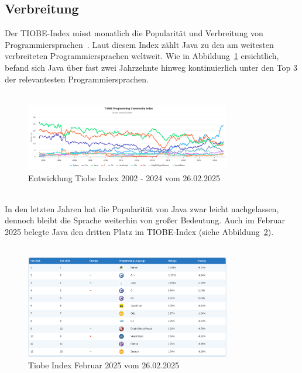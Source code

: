 \documentclass[11pt]{article}
\begin{document}
    \subsection{Verbreitung}
    Der TIOBE-Index misst monatlich die Popularität und Verbreitung von Programmiersprachen~\cite{tiobe}.
    Laut diesem Index zählt Java zu den am weitesten verbreiteten Programmiersprachen weltweit.
    Wie in Abbildung~\ref{fig:entwicklung-tiobe} ersichtlich, befand sich Java über fast zwei Jahrzehnte hinweg
    kontinuierlich unter den Top 3 der relevantesten Programmiersprachen.\\
    \\
    \begin{figure}[h]
        \centering
        \includegraphics[width=0.8\textwidth]{pictures/Screenshot 2025-02-26 at 19-53-49 TIOBE Index - TIOBE}
        \caption{Entwicklung Tiobe Index 2002 - 2024 vom 26.02.2025 }
        \label{fig:entwicklung-tiobe}
    \end{figure}
    \\
    In den letzten Jahren hat die Popularität von Java zwar leicht nachgelassen, dennoch bleibt die Sprache weiterhin
    von großer Bedeutung.
    Auch im Februar 2025 belegte Java den dritten Platz im TIOBE-Index (siehe Abbildung~\ref{fig:tiobe-java-2025}).\\
    \\
    \begin{figure}[h]
        \centering
        \includegraphics[width=0.8\textwidth]{pictures/Screenshot 2025-02-26 at 19-54-42 TIOBE Index - TIOBE}
        \caption{Tiobe Index Februar 2025 vom 26.02.2025}
        \label{fig:tiobe-java-2025}
    \end{figure}
\end{document}
